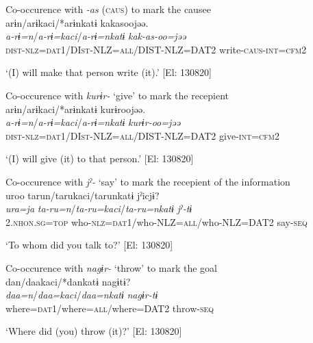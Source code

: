 \begin{table}
\ex Co-occurence with \textit{-as} (\textsc{caus}) to mark the causee\\

{\TM}
\glll arɨn/arɨkaci/*arɨnkatɨ  kakasoojəə.\\
\textit{a-rɨ=n}/\textit{a-rɨ=kaci}/\textit{a-rɨ=nkatɨ}  \textit{kak-as-oo=jəə}\\

    \textsc{dist}-\textsc{nlz}=\textsc{dat}1/DI\textsc{st}-NLZ=\textsc{all}/DIST-NLZ=DAT2  write-\textsc{caus}-\textsc{int}=\textsc{cfm}2

\glt    ‘(I) will make that person write (it).’ [El: 130820]

\ex Co-occurence with \textit{kurɨr-} ‘give’ to mark the recepient\\

{\TM}
\glll arɨn/arɨkaci/*arɨnkatɨ  kurɨroojəə.\\
\textit{a-rɨ=n}/\textit{a-rɨ=kaci}/\textit{a-rɨ=nkatɨ}  \textit{kurɨr-oo=jəə}\\

    \textsc{dist}-\textsc{nlz}=\textsc{dat}1/DI\textsc{st}-NLZ=\textsc{all}/DIST-NLZ=DAT2  give-\textsc{int}=\textsc{cfm}2

\glt    ‘(I) will give (it) to that person.’ [El: 130820]

\ex Co-occurence with \textit{jˀ-} ‘say’ to mark the recepient of the information\\

{\TM}
\glll uroo  tarun/tarukaci/tarunkatɨ  jˀicjɨ?\\
\textit{ura=ja}  \textit{ta-ru=n}/\textit{ta-ru=kaci}/\textit{ta-ru=nkatɨ}  \textit{jˀ-tɨ}\\

    2.\textsc{nhon}.\textsc{sg}=\textsc{top}  who-\textsc{nlz}=\textsc{dat}1/who-NLZ=\textsc{all}/who-NLZ=DAT2  say-\textsc{seq}

\glt    ‘To whom did you talk to?’ [El: 130820]

\ex Co-occurence with \textit{nagɨr-} ‘throw’ to mark the goal\\

{\TM}
\glll *dan/daakaci/*dankatɨ  nagɨtɨ?\\
\textit{daa=n}/\textit{daa=kaci}/\textit{daa=nkatɨ}  \textit{nagɨr-tɨ}\\

     where=\textsc{dat}1/where=\textsc{all}/where=DAT2  throw-\textsc{seq}

 \glt    ‘Where did (you) throw (it)?’ [El: 130820]


\end{table}
